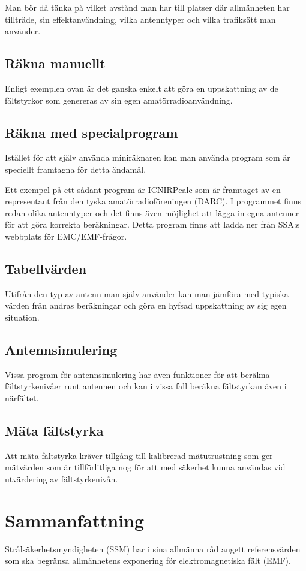 Man bör då tänka på vilket avstånd man har till platser där allmänheten har
tillträde, sin effektanvändning, vilka antenntyper och vilka trafiksätt man
använder.

\subsection{Räkna manuellt}

Enligt exemplen ovan är det ganska enkelt att göra en uppskattning av
de fältstyrkor som genereras av sin egen amatörradioanvändning.

\subsection{Räkna med specialprogram}

Istället för att själv använda miniräknaren kan man använda program
som är speciellt framtagna för detta ändamål.

Ett exempel på ett sådant program är ICNIRPcalc som är framtaget av en
representant från den tyska amatörradioföreningen (DARC).
I programmet finns redan olika antenntyper och det finns även möjlighet att
lägga in egna antenner för att göra korrekta beräkningar.
Detta program finns att ladda ner från SSA:s webbplats för EMC/EMF-frågor.

\subsection{Tabellvärden}
Utifrån den typ av antenn man själv använder kan man jämföra med
typiska värden från andras beräkningar och göra en hyfsad uppskattning
av sig egen situation.

\subsection{Antennsimulering}
Vissa program för antennsimulering har även funktioner för att beräkna
fältstyrkenivåer runt antennen och kan i vissa fall beräkna fältstyrkan
även i närfältet.

\subsection{Mäta fältstyrka}
Att mäta fältstyrka kräver tillgång till kalibrerad mätutrustning som
ger mätvärden som är tillförlitliga nog för att med säkerhet kunna användas
vid utvärdering av fältstyrkenivån.

\section{Sammanfattning}
Strålsäkerhetsmyndigheten (SSM) har i sina allmänna råd angett referensvärden
som ska begränsa allmänhetens exponering för elektromagnetiska fält (EMF).

